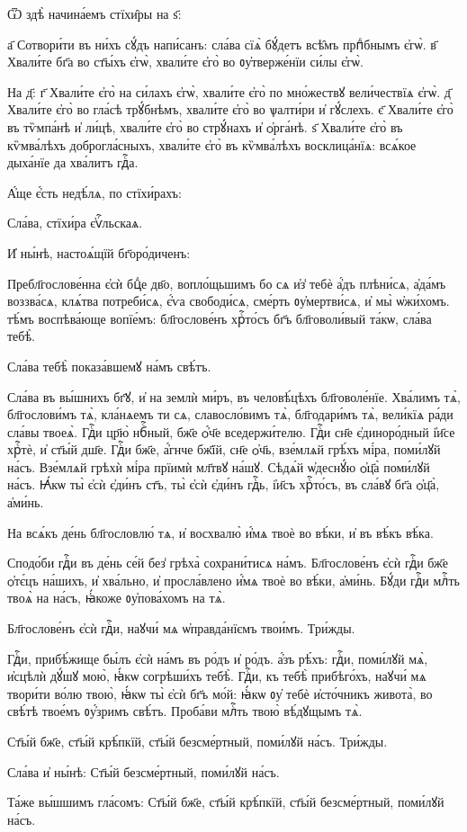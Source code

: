 \hKv Ѿ здѣ̀ начина́емъ стїхи̑ры на ѕ҃: 

\hKv а҃ Сотвори́ти въ ни́хъ сꙋ́дъ напи́санъ: сла́ва сїѧ̀  бꙋ́детъ всѣ̑мъ прпⷣбнымъ є҆гѡ̀. в҃ Хвали́те бг҃а во  ст҃ы́хъ є҆гѡ̀, хвали́те є҆го̀ во ᲂу҆тверже́нїи си́лы  є҆гѡ̀. 

\hKv На д҃: г҃ Хвали́те є҆го̀ на си́лахъ є҆гѡ̀, хвали́те  є҆го̀ по мно́жествꙋ вели́чествїѧ є҆гѡ̀. д҃ Хвали́те  є҆го̀ во гла́сѣ трꙋ́бнѣмъ, хвали́те є҆го̀ во ѱалти́ри  и҆ гꙋ́слехъ. є҃ Хвали́те є҆го̀ въ тѷмпа́нѣ и҆ ли́цѣ,  хвали́те є҆го̀ во стрꙋ́нахъ и҆ ѻ҆рга́нѣ. ѕ҃ Хвали́те  є҆го̀ въ кѷмва́лѣхъ доброгла́сныхъ,  хвали́те є҆го̀ въ кѷмва́лѣхъ восклица́нїѧ: всѧ́кое  дыха́нїе да хва́литъ гдⷭ҇а. 

\hKv А҆́ще є҆́сть недѣ́лѧ, по стїхи́рахъ: 

\hKv Сла́ва, стїхи́ра є҆ѵⷢ҇льскаѧ. 

\hKv И҆ ны́нѣ, настоѧ́щїй бг҃оро́диченъ: 

\hKv Пребл҃гослове́нна є҆сѝ бцⷣе дв҃о, вопло́щьшимъ бо сѧ  и҆з̾ тебѐ а҆́дъ плѣни́сѧ, а҆да́мъ воззва́сѧ, клѧ́тва  потреби́сѧ, є҆́ѵа свободи́сѧ, сме́рть ᲂу҆мертви́сѧ, и҆ мы̀  ѡ҆жи́хомъ. тѣ́мъ воспѣва́юще вопїе́мъ: бл҃гослове́нъ  хрⷭ҇то́съ бг҃ъ бл҃говоли́вый та́кѡ, сла́ва тебѣ̀. 

\hKv Сла́ва тебѣ̀ показа́вшемꙋ на́мъ свѣ́тъ. 

\hKv Сла́ва въ вы́шнихъ бг҃ꙋ, и҆ на землѝ ми́ръ, въ  человѣ́цѣхъ бл҃говоле́нїе. Хва́лимъ тѧ̀, бл҃гослови́мъ  тѧ̀, кла́нѧемъ ти сѧ, славосло́вимъ тѧ̀, бл҃годари́мъ тѧ̀,  вели́кїѧ ра́ди сла́вы твоеѧ̀. Гдⷭ҇и цр҃ю̀ нбⷭ҇ный, бж҃е  ѻ҆́ч҃е вседержи́телю. Гдⷭ҇и сн҃е є҆диноро́дный і҆и҃се  хрⷭ҇тѐ, и҆ ст҃ы́й дш҃е. Гдⷭ҇и бж҃е, а҆́гнче бж҃їй, сн҃е  ѻ҆ч҃ь, взе́млѧй грѣ́хъ мі́ра, поми́лꙋй на́съ. Взе́млѧй  грѣхѝ мі́ра прїимѝ мл҃твꙋ  на́шꙋ. Сѣдѧ́й ѡ҆деснꙋ́ю ѻ҆ц҃а̀ поми́лꙋй на́съ. Ꙗ҆́кѡ ты̀  є҆сѝ є҆ди́нъ ст҃ъ, ты̀ є҆сѝ є҆ди́нъ гдⷭ҇ь, і҆и҃съ  хрⷭ҇то́съ, въ сла́вꙋ бг҃а ѻ҆ц҃а̀, а҆ми́нь. 

\hKv На всѧ́къ де́нь бл҃гословлю́ тѧ, и҆ восхвалю̀ и҆́мѧ твоѐ во  вѣ́ки, и҆ въ вѣ́къ вѣ́ка. 

\hKv Сподо́би гдⷭ҇и въ де́нь се́й без̾ грѣха̀ сохрани́тисѧ  на́мъ. Бл҃гослове́нъ є҆сѝ гдⷭ҇и бж҃е ѻ҆тє́цъ на́шихъ, и҆  хва́льно, и҆ просла́влено и҆́мѧ твоѐ во вѣ́ки, а҆ми́нь.  Бꙋ́ди гдⷭ҇и млⷭ҇ть твоѧ̀ на на́съ, ꙗ҆́коже ᲂу҆пова́хомъ на  тѧ̀. 

\hKv Бл҃гослове́нъ є҆сѝ гдⷭ҇и, наꙋчи́ мѧ ѡ҆правда́нїємъ  твои́мъ. Три́жды. 

\hKv Гдⷭ҇и, прибѣ́жище бы́лъ є҆сѝ на́мъ въ ро́дъ и҆ ро́дъ.  а҆́зъ рѣ́хъ: гдⷭ҇и, поми́лꙋй мѧ̀, и҆сцѣлѝ дꙋ́шꙋ мою̀,  ꙗ҆́кѡ согрѣши́хъ тебѣ̀. Гдⷭ҇и, къ тебѣ̀ прибѣго́хъ,  наꙋчи́ мѧ твори́ти во́лю твою̀, ꙗ҆́кѡ ты̀ є҆сѝ бг҃ъ мо́й:  ꙗ҆́кѡ ᲂу҆ тебѐ и҆сто́чникъ живота̀, во свѣ́тѣ твое́мъ  ᲂу҆́зримъ свѣ́тъ. Проба́ви млⷭ҇ть твою̀ вѣ́дꙋщымъ тѧ̀.   

\hKv Ст҃ы́й бж҃е, ст҃ы́й крѣ́пкїй, ст҃ы́й безсме́ртный, поми́лꙋй  на́съ. Три́жды. 

\hKv Сла́ва и҆ ны́нѣ: Ст҃ы́й безсме́ртный, поми́лꙋй на́съ. 

\hKv Та́же вы́шшимъ гла́сомъ: Ст҃ы́й бж҃е, ст҃ы́й крѣ́пкїй,  ст҃ы́й безсме́ртный, поми́лꙋй на́съ.  
